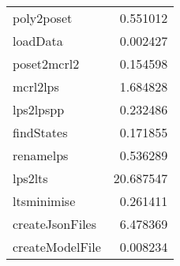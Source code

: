 \begin{tabular}{lr}
\toprule
\midrule
poly2poset & 0.551012 \\
loadData & 0.002427 \\
poset2mcrl2 & 0.154598 \\
mcrl2lps & 1.684828 \\
lps2lpspp & 0.232486 \\
findStates & 0.171855 \\
renamelps & 0.536289 \\
lps2lts & 20.687547 \\
ltsminimise & 0.261411 \\
createJsonFiles & 6.478369 \\
createModelFile & 0.008234 \\
\bottomrule
\end{tabular}
